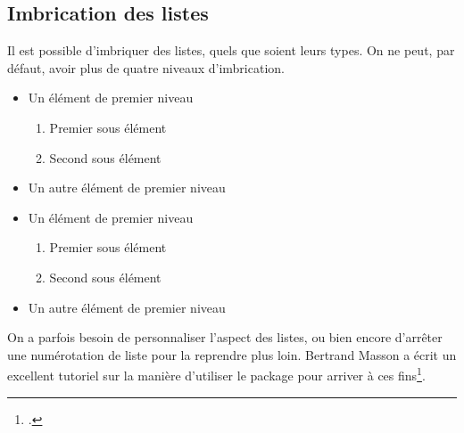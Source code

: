 \subsection{Imbrication des listes}

Il est possible d'imbriquer des listes, quels que soient leurs types. On ne peut, par défaut, avoir plus de quatre niveaux d'imbrication.

\begin{latexcode}
\begin{itemize}
    \item Un élément de premier niveau
    \begin{enumerate}
            \item Premier sous élément
            \item Second sous élément
    \end{enumerate}
    \item Un autre élément de premier niveau
\end{itemize}
\end{latexcode}

\begin{quotation*}
\begin{itemize}
    \item Un élément de premier niveau
    \begin{enumerate}
            \item Premier sous élément
            \item Second sous élément
    \end{enumerate}
    \item Un autre élément de premier niveau
\end{itemize}
\end{quotation*}

\begin{plusloins}
On a parfois besoin de personnaliser l'aspect des listes, ou bien encore d'arrêter une numérotation de liste pour la reprendre plus loin. Bertrand Masson a écrit un excellent tutoriel sur la manière d'utiliser le package  pour arriver à ces fins\footcite{bebert_liste}. 
\end{plusloins}
